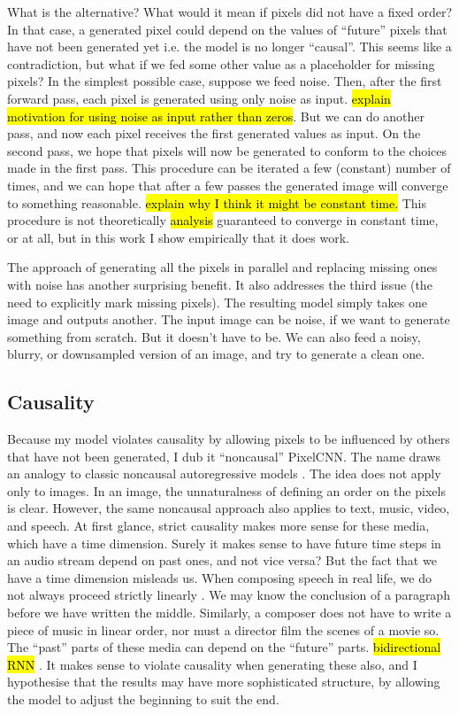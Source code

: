 \documentclass[10pt,a4paper]{article}
\newcommand{\nquote}[1]{``{#1}''}
\begin{document}
What is the alternative? What would it mean if pixels did not have a fixed order? In that case, a generated pixel could depend on the values of \nquote{future} pixels that have not been generated yet i.e. the model is no longer \nquote{causal}. This seems like a contradiction, but what if we fed some other value as a placeholder for missing pixels? In the simplest possible case, suppose we feed noise. Then, after the first forward pass, each pixel is generated using only noise as input. \hl{explain motivation for using noise as input rather than zeros}. But we can do another pass, and now each pixel receives the first generated values as input. On the second pass, we hope that pixels will now be generated to conform to the choices made in the first pass. This procedure can be iterated a few (constant) number of times, and we can hope that after a few passes the generated image will converge to something reasonable. \hl{explain why I think it might be constant time.} This procedure is not theoretically \hl{analysis} guaranteed to converge in constant time, or at all, but in this work I show empirically that it does work.

The approach of generating all the pixels in parallel and replacing missing ones with noise has another surprising benefit. It also addresses the third issue (the need to explicitly mark missing pixels). The resulting model simply takes one image and outputs another. The input image can be noise, if we want to generate something from scratch. But it doesn't have to be. We can also feed a noisy, blurry, or downsampled version of an image, and try to generate a clean one.

\subsection{Causality}

Because my model violates causality by allowing pixels to be influenced by others that have not been generated, I dub it \nquote{noncausal} PixelCNN. The name draws an analogy to classic noncausal autoregressive models \cite{??,??}. The idea does not apply only to images. In an image, the unnaturalness of defining an order on the pixels is clear. However, the same noncausal approach also applies to text, music, video, and speech. At first glance, strict causality makes more sense for these media, which have a time dimension. Surely it makes sense to have future time steps in an audio stream depend on past ones, and not vice versa? But the fact that we have a time dimension misleads us. When composing speech in real life, we do not always proceed strictly linearly \cite{??}. We may know the conclusion of a paragraph before we have written the middle. Similarly, a composer does not have to write a piece of music in linear order, nor must a director film the scenes of a movie so. The \nquote{past} parts of these media can depend on the \nquote{future} parts. \hl{bidirectional RNN} \cite{??}. It makes sense to violate causality when generating these also, and I hypothesise that the results may have more sophisticated structure, by allowing the model to adjust the beginning to suit the end.
\end{document}
